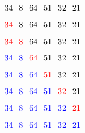 \documentclass{book}
\begin{document}
	 \begin{center}
	$$34 \hspace*{0.25cm} 8 \hspace*{0.25cm}  64 \hspace*{0.25cm}  51 \hspace*{0.25cm}  32 \hspace*{0.25cm} 21$$
		$$\textcolor{red}{34} \hspace*{0.25cm} 8 \hspace*{0.25cm}  64 \hspace*{0.25cm}  51 \hspace*{0.25cm}  32 \hspace*{0.25cm} 21$$
		$$\textcolor{red}{34 \hspace*{0.25cm} 8} \hspace*{0.25cm}  64 \hspace*{0.25cm}  51 \hspace*{0.25cm}  32 \hspace*{0.25cm} 21$$
			$$\textcolor{blue}{34 \hspace*{0.25cm} 8 \hspace*{0.25cm}}  \textcolor{red}{64} \hspace*{0.25cm}  51 \hspace*{0.25cm}  32 \hspace*{0.25cm} 21$$
				$$\textcolor{blue}{34 \hspace*{0.25cm} 8 \hspace*{0.25cm}  64 \hspace*{0.25cm}}  \textcolor{red}{51} \hspace*{0.25cm}  32 \hspace*{0.25cm} 21$$
						$$\textcolor{blue}{34 \hspace*{0.25cm} 8 \hspace*{0.25cm}  64 \hspace*{0.25cm}  51 \hspace*{0.25cm}}  \textcolor{red}{32} \hspace*{0.25cm} 21$$
										$$\textcolor{blue}{34 \hspace*{0.25cm} 8 \hspace*{0.25cm}  64 \hspace*{0.25cm}  51 \hspace*{0.25cm}  32 \hspace*{0.25cm}}
										\textcolor{red}{21} $$
$$\textcolor{blue}{34 \hspace*{0.25cm} 8 \hspace*{0.25cm}  64 \hspace*{0.25cm}  51 \hspace*{0.25cm}  32 \hspace*{0.25cm}
{21}} $$
	 \end{center}
\end{document}
